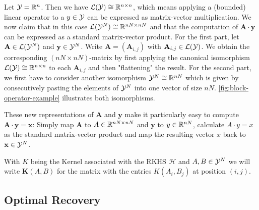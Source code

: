 

\begin{example}
	Let $\mathcal{Y} = \mathbb{R}^n$.
	Then we have $\mathcal{L}(\mathcal{Y}) \cong \mathbb{R}^{n\times n}$, which means applying a (bounded) linear operator to a $y \in \mathcal{Y}$ can be expressed as matrix-vector multiplication.
	We now claim that in this case $\mathcal{L}(\mathcal{Y}^N) \cong \mathbb{R}^{nN \times nN}$ and that the computation of $\mathbf{A}\cdot \mathbf{y}$ can be expressed as a standard matrix-vector product.
	For the first part, let $\mathbf{A} \in \mathcal{L}(\mathcal{Y}^N)$ and $\mathbf{y} \in \mathcal{Y}^N$. 
	Write $\mathbf{A} = (\mathbf{A}_{i, j})$ with $\mathbf{A}_{i,j} \in \mathcal{L}(\mathcal{Y})$. 
	We obtain the corresponding $(nN \times nN)$-matrix by first applying the canonical isomorphism $\mathcal{L}(\mathcal{Y}) \cong \mathbb{R}^{n\times n}$ to each $\mathbf{A}_{i,j}$ and then "flattening" the result.
	For the second part, we first have to consider another isomorphism $\mathcal{Y}^N \cong \mathbb{R}^{nN}$ which is given by consecutively pasting the elements of $\mathcal{Y}^N$ into one vector of size $nN$.
	\cref{fig:block-operator-example} illustrates both isomorphisms.
	
	These new representations of $\mathbf{A}$ and $\mathbf{y}$ make it particularly easy to compute $\mathbf{A}\cdot \mathbf{y} = \mathbf{x}$:
	Simply map $\mathbf{A}$ to $A \in \mathbb{R}^{nN \times nN}$ and $\mathbf{y}$ to $y \in \mathbb{R}^{nN}$, calculate $A \cdot y = x$ as the standard matrix-vector product and map the resulting vector $x$ back to $\mathbf{x} \in\mathcal{Y}^N$.	
\end{example}

With $K$ being the Kernel associated with the RKHS $\mathcal{H}$ and $A, B \in \mathcal{Y}^N$ we will write $\mathbf{K}(A, B)$ for the matrix with the entries $K(A_i, B_j)$ at position $(i, j)$.


\subsection{Optimal Recovery}
\label{sec:optimal-recovery}

\begin{theorem}
	\label{theo:representer}
\end{theorem}

